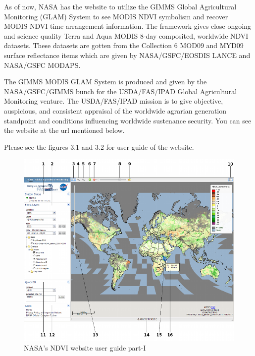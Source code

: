 As of now, NASA has the website to utilize the GIMMS Global Agricultural Monitoring (GLAM) System to see MODIS NDVI symbolism and recover MODIS NDVI time arrangement information. The framework gives close ongoing and science quality Terra and Aqua MODIS 8-day composited, worldwide NDVI datasets. These datasets are gotten from the Collection 6 MOD09 and MYD09 surface reflectance items which are given by NASA/GSFC/EOSDIS LANCE and NASA/GSFC MODAPS.

The GIMMS MODIS GLAM System is produced and given by the NASA/GSFC/GIMMS bunch for the USDA/FAS/IPAD Global Agricultural Monitoring venture. The USDA/FAS/IPAD mission is to give objective, auspicious, and consistent appraisal of the worldwide agrarian generation standpoint and conditions influencing worldwide sustenance security. You can see the website at the url mentioned below. \\
\centerline{}

Please see the figures 3.1 and 3.2 for user guide of the website.

    \begin{figure}[H]
            \centering
            \includegraphics[width=1.0\linewidth]{figures/ch3/nasa_website_1.png}
            \caption{\label{fig:nasa_website_1} NASA's NDVI website user guide part-I}
    \end{figure}
    
